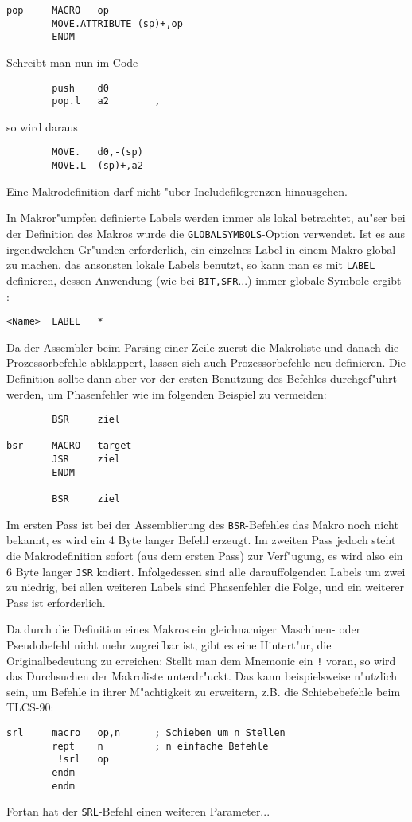 \documentclass[12pt,a4paper,twoside]{report}
\newcommand{\tty}[1]{{\tt #1}}
\begin{document}
{\begin{verbatim}
pop     MACRO   op
        MOVE.ATTRIBUTE (sp)+,op
        ENDM
\end{verbatim}
Schreibt man nun im Code
\begin{verbatim}
        push    d0
        pop.l   a2        ,
\end{verbatim}
so wird daraus
\begin{verbatim}
        MOVE.   d0,-(sp)
        MOVE.L  (sp)+,a2
\end{verbatim}
Eine Makrodefinition darf nicht "uber Includefilegrenzen hinausgehen.
\par
In Makror"umpfen definierte Labels werden immer als lokal betrachtet,
au"ser bei der Definition des Makros wurde die
\tty{GLOBALSYMBOLS}-Option verwendet.  Ist es aus irgendwelchen Gr"unden
erforderlich, ein einzelnes Label in einem Makro global zu
machen, das ansonsten lokale Labels benutzt, so kann man es mit
\tty{LABEL} definieren, dessen Anwendung (wie bei \tty{BIT,SFR}...)
immer globale Symbole ergibt :
\begin{verbatim}
<Name>  LABEL   *
\end{verbatim}
Da der Assembler beim Parsing einer Zeile zuerst die Makroliste und
danach die Prozessorbefehle abklappert, lassen sich auch Prozessorbefehle
neu definieren.  Die Definition sollte dann aber vor der ersten Benutzung
des Befehles durchgef"uhrt werden, um Phasenfehler wie im folgenden
Beispiel zu vermeiden:
\begin{verbatim}
        BSR     ziel

bsr     MACRO   target
        JSR     ziel
        ENDM

        BSR     ziel
\end{verbatim}
Im ersten Pass ist bei der Assemblierung des \tty{BSR}-Befehles das Makro
noch nicht bekannt, es wird ein 4 Byte langer Befehl erzeugt.  Im
zweiten Pass jedoch steht die Makrodefinition sofort (aus dem ersten
Pass) zur Verf"ugung, es wird also ein 6 Byte langer \tty{JSR} kodiert.
Infolgedessen sind alle darauffolgenden Labels um zwei zu niedrig,
bei allen weiteren Labels sind Phasenfehler die Folge, und ein weiterer
Pass ist erforderlich.
\par
Da durch die Definition eines Makros ein gleichnamiger Maschinen- oder
Pseudobefehl nicht mehr zugreifbar ist, gibt es eine Hintert"ur, die
Originalbedeutung zu erreichen: Stellt man dem Mnemonic ein \tty{!} voran,
so wird das Durchsuchen der Makroliste unterdr"uckt.  Das kann
beispielsweise n"utzlich sein, um Befehle in ihrer M"achtigkeit zu
erweitern, z.B. die Schiebebefehle beim TLCS-90:
\begin{verbatim}
srl     macro   op,n      ; Schieben um n Stellen
        rept    n         ; n einfache Befehle
         !srl   op
        endm
        endm
\end{verbatim}
Fortan hat der \tty{SRL}-Befehl einen weiteren Parameter...

}
\end{document}
